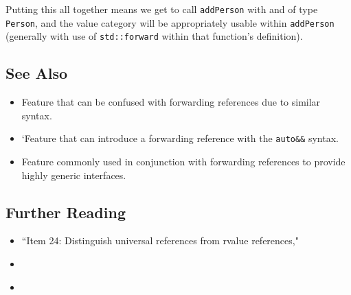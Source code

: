 Putting this all together means we get to call \lstinline!addPerson! with
 and  of type \lstinline!Person!, and the value
category will be appropriately usable within \lstinline!addPerson!
(generally with use of \lstinline!std::forward! within that function's
definition).

\subsection[See Also]{See Also}\label{see-also}

\begin{itemize}
\item{Feature that can be confused with forwarding references due to similar syntax.}
\item{`Feature that can introduce a forwarding reference with the \lstinline!auto&&! syntax.}
\item{Feature commonly used in conjunction with forwarding references to provide highly generic interfaces.}
\end{itemize}

\subsection[Further Reading]{Further Reading}\label{further-reading}

\begin{itemize}
\item{``Item 24: Distinguish universal references from rvalue references," \cite{meyers15}}
\item{\cite{sutter14}}
\item{\cite{niebler13}}
\end{itemize}



